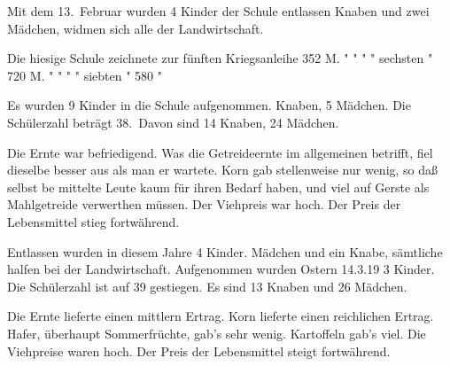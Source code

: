 

\pstart
Mit dem 13.\ Februar wurden 4 Kinder der Schule entlassen Knaben und zwei Mädchen, widmen sich alle der Landwirtschaft.

\pend
{}
\pstart

Die hiesige Schule zeichnete zur fünften Kriegsanleihe 352 M.\ob
"        "      "     "    sechsten   "              720 M.\ob
"        "      "     "    siebten    "              580 "

\pend
{}
\pstart

Es wurden 9 Kinder in die Schule aufgenommen. Knaben, 5 Mädchen. Die Schülerzahl beträgt 38.\ Davon\ob
sind 14 Knaben, 24 Mädchen.

\pend
{}
\pstart

Die Ernte war befriedigend. Was die Getreideernte im\ob
allgemeinen betrifft, fiel dieselbe besser aus als man er\ohb
wartete. Korn gab stellenweise nur wenig, so daß selbst be\ohb
mittelte Leute kaum für ihren Bedarf haben, und viel auf\ob
Gerste als Mahlgetreide verwerthen müssen. Der Viehpreis\ob
war hoch. Der Preis der Lebensmittel stieg fortwährend.

\pend
{}
\pstart

Entlassen wurden in diesem Jahre 4 Kinder. Mädchen und ein Knabe, sämtliche halfen\ob
bei der Landwirtschaft. Aufgenommen wurden\ob
Ostern 14.3.19 3 Kinder. Die Schülerzahl ist auf 39 gestiegen.\ob
Es sind 13 Knaben und 26 Mädchen.

\pend
{}
\pstart

Die Ernte lieferte einen mittlern Ertrag. Korn lieferte einen\ob
reichlichen Ertrag. Hafer, überhaupt Sommerfrüchte, gab's sehr wenig. Kartoffeln\ob
gab's viel. Die Viehpreise waren hoch. Der Preis der Lebensmittel steigt\ob
fortwährend.
\pend
